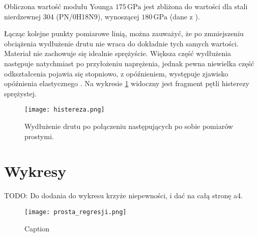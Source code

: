 \documentclass[a4paper,12pt]{article}
\begin{document}
Obliczona wartość modułu Younga \( 175\,\text{GPa} \) jest zbliżona do wartości dla stali nierdzewnej 304 (PN/0H18N9), wynoszącej \( 180\,\text{GPa} \) (dane z \cite{calculla}).  

Łącząc kolejne punkty pomiarowe linią, można zauważyć, że po zmniejszeniu obciążenia wydłużenie drutu nie wraca do dokładnie tych samych wartości. Materiał nie zachowuje się idealnie sprężyście. Większa część wydłużenia następuje natychmiast po przyłożeniu naprężenia, jednak pewna niewielka część odkształcenia pojawia się stopniowo, z opóźnieniem, występuje zjawisko opóźnienia elastycznego \cite{Drynski1976}. Na wykresie \ref{fig:histereza} widoczny jest fragment pętli histerezy sprężystej. 

\begin{figure}[H]
    \centering
    \texttt{[image: histereza.png]}
    \caption{Wydłużenie drutu po połączeniu następujących po sobie pomiarów prostymi.}
    \label{fig:histereza}
\end{figure}

\section{Wykresy}

TODO: Do dodania do wykresu krzyże niepewności, i dać na całą stronę a4.


\begin{figure}[H]
    \centering
    \texttt{[image: prosta\_regresji.png]}
    \caption{Caption}
    \label{fig:prosta_regresji}
\end{figure}





\end{document}
